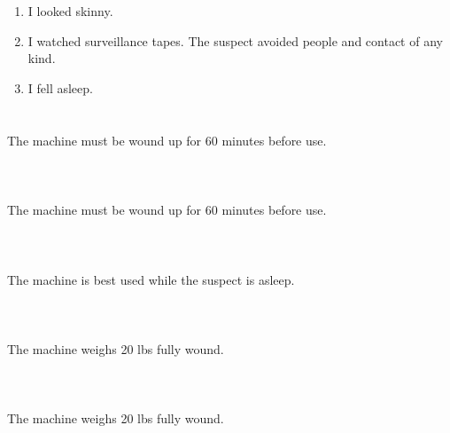 \documentclass{article}
\begin{document}
    \newpage
    
    \section{}
    
    \begin{enumerate}
    
    \item I looked skinny.\\
    
    \item I watched surveillance tapes. The suspect avoided people and contact of any kind.\\
    
    \item I fell asleep.\\
    
    \end{enumerate}
     
    \newpage
    
    \section{}
    The machine must be wound up for 60 minutes before use.\\\\ 
    \newpage
    
    \section{}
    The machine must be wound up for 60 minutes before use.\\\\ 
    \newpage
    
    \section{}
    The machine is best used while the suspect is asleep.\\\\ 
    \newpage
    
    \section{}
    The machine weighs 20 lbs fully wound.\\\\ 
    \newpage
    
    \section{}
    The machine weighs 20 lbs fully wound.\\\\ 
    \newpage
    
\end{document}
